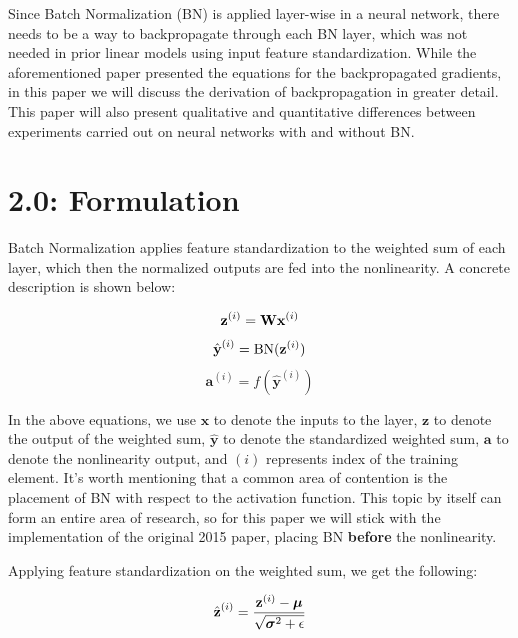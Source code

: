 \documentclass{article}
\begin{document}
\begin{multicols}{2}
Since Batch Normalization (BN) is applied layer-wise in a neural network, 
there needs to be a way to backpropagate through each BN layer, which 
was not needed in prior linear models using input feature standardization.
While the aforementioned paper presented the equations for the backpropagated
gradients, in this paper we will discuss the derivation of backpropagation
in greater detail. This paper will also present qualitative and quantitative
differences between experiments carried out on neural networks with 
and without BN.








\section*{2.0: Formulation}

Batch Normalization applies feature standardization to the weighted sum of 
each layer, which then the normalized outputs are fed into the nonlinearity.
A concrete description is shown below:

\begin{equation}
    \textbf{z}^{(i)} = \textbf{W}\textbf{x}^{(i)} \notag
\end{equation}
\begin{equation}
    \hat{\textbf{y}}^{(i)} = \text{BN}(\textbf{z}^{(i)}) \notag
\end{equation}
\begin{equation}
    \textbf{a}^{(i)} = f(\hat{\textbf{y}}^{(i)}) 
\end{equation}

In the above equations, we use $\textbf{x}$ to denote the inputs to the layer, 
$\textbf{z}$ to denote the output of the weighted sum, 
$\hat{\textbf{y}}$ to denote the standardized weighted sum,
$\textbf{a}$ to denote the nonlinearity output, and $(i)$ represents index 
of the training element.
It's worth mentioning that a common area of contention is the placement 
of BN with respect to the activation function. This topic by itself 
can form an entire area of research, so for this paper we will stick with the 
implementation of the original 2015 paper, placing BN \textbf{before} the nonlinearity.

Applying feature standardization on the weighted sum, we get the following:

\begin{equation}
    \hat{\textbf{z}}^{(i)} = {\textbf{z}^{(i)} - \boldsymbol{\mu}\over \sqrt{\boldsymbol{\sigma}^2 + \epsilon}} 
\end{equation}


\end{multicols}
\end{document}
